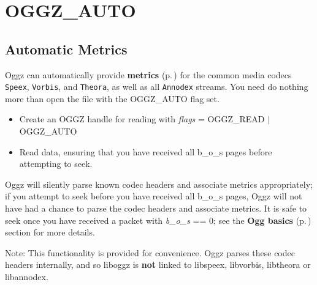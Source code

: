 \section{OGGZ\_\-AUTO}
\label{group__auto}
\subsection{Automatic Metrics}\label{auto}
Oggz can automatically provide {\bf metrics }{\rm (p.\,\pageref{group__metric})} for the common media codecs {\tt Speex}, {\tt Vorbis}, and {\tt Theora}, as well as all {\tt Annodex} streams. You need do nothing more than open the file with the OGGZ\_\-AUTO flag set.

\begin{itemize}
\item Create an OGGZ handle for reading with {\em flags\/} = OGGZ\_\-READ $|$ OGGZ\_\-AUTO\item Read data, ensuring that you have received all b\_\-o\_\-s pages before attempting to seek.\end{itemize}


Oggz will silently parse known codec headers and associate metrics appropriately; if you attempt to seek before you have received all b\_\-o\_\-s pages, Oggz will not have had a chance to parse the codec headers and associate metrics. It is safe to seek once you have received a packet with {\em b\_\-o\_\-s\/} == 0; see the {\bf Ogg basics }{\rm (p.\,\pageref{group__basics})} section for more details.

\begin{Desc}
\item[Note:]This functionality is provided for convenience. Oggz parses these codec headers internally, and so liboggz is {\bf not} linked to libspeex, libvorbis, libtheora or libannodex. \end{Desc}



